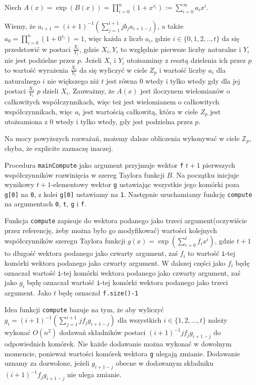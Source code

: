 \documentclass{article}
\begin{document}
Niech $A(x)=\exp(B(x))=\prod_{i=0}^n(1+x^{s_i}):=\sum_{i=0}^{\infty}a_ix^i$.

Wiemy, że $a_{i+1}=(i+1)^{-1}(\sum_{j=1}^{i+1}jb_ja_{i+1-j})$, a także $a_0=\prod_{i=0}^n(1+0^{s_i})=1$, więc każda
z liczb $a_i$, gdzie $i \in \{0,1,2,..,t \}$ da się przedstawić w postaci $\frac{X_i}{Y_i}$, gdzie $X_i,Y_i$ to
względnie pierwsze liczby naturalne i $Y_i$ nie jest podzielne przez $p$. Jeżeli $X_i$ i $Y_i$ utożsamimy z resztą dzielenia ich 
przez $p$ to wartość wyrażenia $\frac{X_i}{Y_i}$ da się wyliczyć w ciele $Z_p$ i wartość liczby $a_i$ dla naturalnego $i$
nie większego niż $t$ jest równa $0$ wtedy i tylko wtedy gdy dla jej postaci $\frac{X_i}{Y_i}$ $p$ dzieli $X_i$. Zauważmy,
że $A(x)$ jest iloczynem wielomianów o całkowitych współczynnikach, więc też jest wielomianem o całkowitych współczynnikach,
więc $a_i$ jest wartością całkowitą, która w ciele $Z_p$ jest utożsamiona z $0$ wtedy i tylko wtedy, gdy jest podzielna przez $p$.

Na mocy powyższych rozważań, możemy dalsze obliczenia wykonywać w ciele $\mathbb{Z}_p$, chyba, że explicite zaznaczę inaczej.


Procedura \texttt{mainCompute} jako argument przyjmuje wektor \texttt{f} $t+1$ pierwszych współczynników rozwinięcia w 
szereg Taylora funkcji $B$. Na początku inicjuje wynikowy $t+1$-elementowy wektor \texttt{g} ustawiając wszystkie
jego komórki poza \texttt{g[0]} na \texttt{0}, z kolei \texttt{g[0]} ustawiamy na \texttt{1}. Następnie uruchamiamy funkcję 
\texttt{compute} na argumentach \texttt{0}, \texttt{t}, \texttt{g} i \texttt{f}.

Funkcja \texttt{compute} zapisuje do wektora podanego jako trzeci argument(oczywiście przez referencję, żeby 
można było go modyfikować) wartości kolejnych współczynników szeregu Taylora funkcji 
$g(x)=\exp(\sum_{i=0}^tf_ix^i)$, gdzie $t+1$ to długość wektora podanego jako czwarty argument, zaś
$f_i$ to wartość \texttt{i}-tej komórki wektora podanego jako czwarty argument. W dalszej części jako $f_i$ będę 
oznaczał wartość \texttt{i}-tej komórki wektora podanego jako czwarty argument, zaś jako $g_i$ będę oznaczał wartość 
\texttt{i}-tej komórki wektora podanego jako trzeci argument. Jako $t$ będę oznaczał \texttt{f.size()-1}

Idea funkcji \texttt{compute} bazuje na tym, że aby wyliczyć $g_i=(i+1)^{-1}(\sum_{j=1}^{i+1}jf_jg_{i+1-j})$ dla wszystkich $i \in \{1,2,...,t\}$ należy
wykonać $O(n^2)$ dodawań składników postaci $(i+1)^{-1}jf_jg_{i+1-j}$ do odpowiednich komórek. Nie każde dodawanie można wykonać w dowolnym
momencie, ponieważ wartości komórek wektora \texttt{g} ulegają zmianie. Dodawanie uznamy za dozwolone, jeżeli $g_{i+1-j}$ obecne w 
dodawanym składniku $(i+1)^{-1}f_jg_{i+1-j}$ nie ulega zmianie. 
\end{document}
